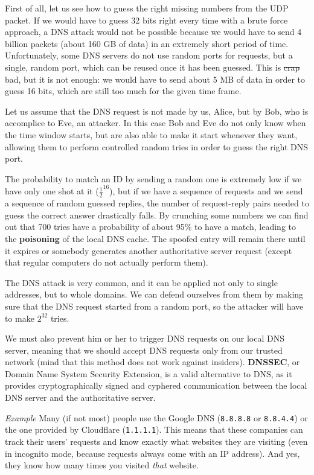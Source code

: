 First of all, let us see how to guess the right missing numbers from the UDP packet. If we would have to guess 32 bits right every time with a brute force approach, a DNS attack would not be possible because we would have to send 4 billion packets (about 160 GB of data) in an extremely short period of time. Unfortunately, some DNS servers do not use random ports for requests, but a single, random port, which can be reused once it has been guessed. This is \sout{crap} bad, but it is not enough: we would have to send about 5 MB of data in order to guess 16 bits, which are still too much for the given time frame.

Let us assume that the DNS request is not made by us, Alice, but by Bob, who is accomplice to Eve, an attacker. In this case Bob and Eve do not only know when the time window starts, but are also able to make it start whenever they want, allowing them to perform controlled random tries in order to guess the right DNS port.

The probability to match an ID by sending a random one is extremely low if we have only one shot at it (${\frac{1}{2}}^{16}$), but if we have a sequence of requests and we send a sequence of random guessed replies, the number of request-reply pairs needed to guess the correct answer drastically falls. By crunching some numbers we can find out that 700 tries have a probability of about 95\% to have a match, leading to the \textbf{poisoning} of the local DNS cache. The spoofed entry will remain there until it expires or somebody generates another authoritative server request (except that regular computers do not actually perform them).

The DNS attack is very common, and it can be applied not only to single addresses, but to whole domains. We can defend ourselves from them by making sure that the DNS request started from a random port, so the attacker will have to make $2^{32}$ tries.

We must also prevent him or her to trigger DNS requests on our local DNS server, meaning that we should accept DNS requests only from our trusted network (mind that this method does not work against insiders). \textbf{DNSSEC}, or Domain Name System Security Extension, is a valid alternative to DNS, as it provides cryptographically signed and cyphered communication between the local DNS server and the authoritative server.

\vspace{0.5em}

\emph{Example} Many (if not most) people use the Google DNS (\texttt{8.8.8.8} or \texttt{8.8.4.4}) or the one provided by Cloudflare (\texttt{1.1.1.1}). This means that these companies can track their users’ requests and know exactly what websites they are visiting (even in incognito mode, because requests always come with an IP address). And yes, they know how many times you visited \textit{that} website.


